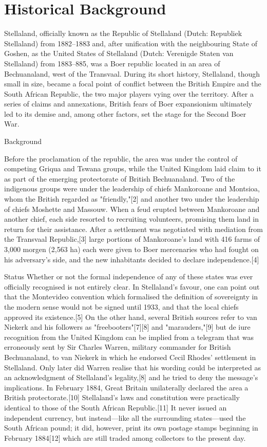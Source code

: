 
\chapter{Historical Background}      

Stellaland, officially known as the Republic of Stellaland (Dutch: Republiek Stellaland) from 1882--1883 and, after unification with the neighbouring State of Goshen, as the United States of Stellaland (Dutch: Verenigde Staten van Stellaland) from 1883--885, was a Boer republic located in an area of Bechuanaland, west of the Transvaal.
During its short history, Stellaland, though small in size, became a focal point of conflict between the British Empire and the South African Republic, the two major players vying over the territory. After a series of claims and annexations, British fears of Boer expansionism ultimately led to its demise and, among other factors, set the stage for the Second Boer War. 

Background

Before the proclamation of the republic, the area was under the control of competing Griqua and Tswana groups, while the United Kingdom laid claim to it as part of the emerging protectorate of British Bechuanaland. Two of the indigenous groups were under the leadership of chiefs Mankoroane and Montsioa, whom the British regarded as "friendly,"[2] and another two under the leadership of chiefs Moshette and Massouw. When a feud erupted between Mankoroane and another chief, each side resorted to recruiting volunteers, promising them land in return for their assistance. After a settlement was negotiated with mediation from the Transvaal Republic,[3] large portions of Mankoroane's land with 416 farms of 3,000 morgen (2,563 ha) each were given to Boer mercenaries who had fought on his adversary's side, and the new inhabitants decided to declare independence.[4] 

Status
Whether or not the formal independence of any of these states was ever officially recognised is not entirely clear. In Stellaland's favour, one can point out that the Montevideo convention which formalised the definition of sovereignty in the modern sense would not be signed until 1933, and that the local chiefs approved its existence.[5] On the other hand, several British sources refer to van Niekerk and his followers as "freebooters"[7][8] and "marauders,"[9] but de iure recognition from the United Kingdom can be implied from a telegram that was erroneously sent by Sir Charles Warren, military commander for British Bechuanaland, to van Niekerk in which he endorsed Cecil Rhodes' settlement in Stellaland. Only later did Warren realise that his wording could be interpreted as an acknowledgment of Stellaland's legality,[8] and he tried to deny the message's implications. In February 1884, Great Britain unilaterally declared the area a British protectorate.[10]
Stellaland's laws and constitution were practically identical to those of the South African Republic.[11] It never issued an independent currency, but instead—like all the surrounding states—used the South African pound; it did, however, print its own postage stamps beginning in February 1884[12] which are still traded among collectors to the present day.

